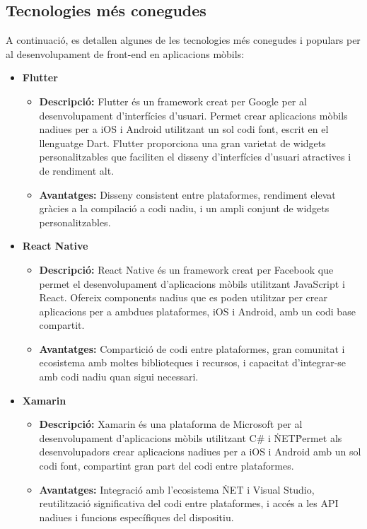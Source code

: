 \documentclass[a4paper,12pt,twoside]{ThesisStyle}
\begin{document}
\subsection{Tecnologies més conegudes}
\label{subsec: Tecnologies més conegudes}

A continuació, es detallen algunes de les tecnologies més conegudes i populars per al desenvolupament de front-end en aplicacions mòbils:

\begin{itemize}
    \item \textbf{Flutter}
    \begin{itemize}
        \item \textbf{Descripció:} Flutter és un framework creat per Google per al desenvolupament d'interfícies d'usuari. Permet crear aplicacions mòbils nadiues per a iOS i Android utilitzant un sol codi font, escrit en el llenguatge Dart. Flutter proporciona una gran varietat de widgets personalitzables que faciliten el disseny d'interfícies d'usuari atractives i de rendiment alt.
        \item \textbf{Avantatges:} Disseny consistent entre plataformes, rendiment elevat gràcies a la compilació a codi nadiu, i un ampli conjunt de widgets personalitzables.
    \end{itemize}

    \item \textbf{React Native}
    \begin{itemize}
        \item \textbf{Descripció:} React Native és un framework creat per Facebook que permet el desenvolupament d'aplicacions mòbils utilitzant JavaScript i React. Ofereix components nadius que es poden utilitzar per crear aplicacions per a ambdues plataformes, iOS i Android, amb un codi base compartit.
        \item \textbf{Avantatges:} Compartició de codi entre plataformes, gran comunitat i ecosistema amb moltes biblioteques i recursos, i capacitat d'integrar-se amb codi nadiu quan sigui necessari.
    \end{itemize}

    \item \textbf{Xamarin}
    \begin{itemize}
        \item \textbf{Descripció:} Xamarin és una plataforma de Microsoft per al desenvolupament d'aplicacions mòbils utilitzant C\# i \.NET\. Permet als desenvolupadors crear aplicacions nadiues per a iOS i Android amb un sol codi font, compartint gran part del codi entre plataformes.
        \item \textbf{Avantatges:} Integració amb l'ecosistema \.NET i Visual Studio, reutilització significativa del codi entre plataformes, i accés a les API nadiues i funcions específiques del dispositiu.
    \end{itemize}


\end{itemize}
\end{document}
